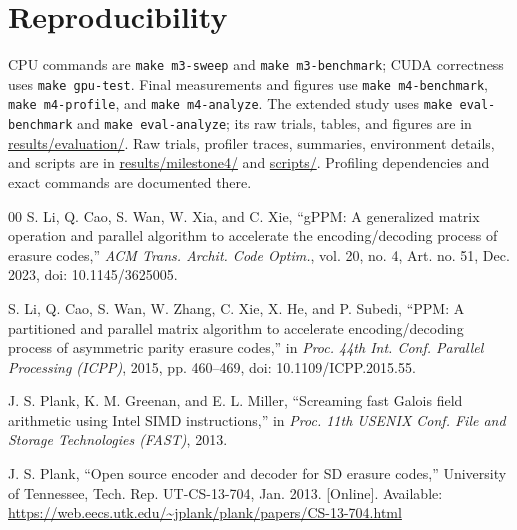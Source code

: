 \documentclass[conference]{IEEEtran}
\begin{document}
\section*{Reproducibility}
\begingroup\raggedright
CPU commands are \texttt{make m3-sweep} and \texttt{make m3-benchmark}; CUDA correctness uses \texttt{make gpu-test}. Final measurements and figures use \texttt{make m4-benchmark}, \texttt{make m4-profile}, and \texttt{make m4-analyze}. The extended study uses \texttt{make eval-benchmark} and \texttt{make eval-analyze}; its raw trials, tables, and figures are in \url{results/evaluation/}. Raw trials, profiler traces, summaries, environment details, and scripts are in \url{results/milestone4/} and \url{scripts/}. Profiling dependencies and exact commands are documented there.
\par\endgroup

\begin{thebibliography}{00}
S. Li, Q. Cao, S. Wan, W. Xia, and C. Xie, ``gPPM: A generalized matrix operation and parallel algorithm to accelerate the encoding/decoding process of erasure codes,'' \emph{ACM Trans. Archit. Code Optim.}, vol. 20, no. 4, Art. no. 51, Dec. 2023, doi: 10.1145/3625005.

S. Li, Q. Cao, S. Wan, W. Zhang, C. Xie, X. He, and P. Subedi, ``PPM: A partitioned and parallel matrix algorithm to accelerate encoding/decoding process of asymmetric parity erasure codes,'' in \emph{Proc. 44th Int. Conf. Parallel Processing (ICPP)}, 2015, pp. 460--469, doi: 10.1109/ICPP.2015.55.

J. S. Plank, K. M. Greenan, and E. L. Miller, ``Screaming fast Galois field arithmetic using Intel SIMD instructions,'' in \emph{Proc. 11th USENIX Conf. File and Storage Technologies (FAST)}, 2013.

J. S. Plank, ``Open source encoder and decoder for SD erasure codes,'' University of Tennessee, Tech. Rep. UT-CS-13-704, Jan. 2013. [Online]. Available: \url{https://web.eecs.utk.edu/~jplank/plank/papers/CS-13-704.html}

\end{thebibliography}
\end{document}
